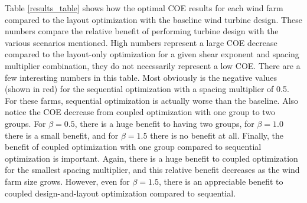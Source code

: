 Table \ref{results_table} shows how the optimal COE results for each wind farm compared to the layout optimization with the baseline wind turbine design. These numbers compare the relative benefit of performing turbine design with the various scenarios mentioned. High numbers represent a large COE decrease compared to the layout-only optimization for a given shear exponent and spacing multiplier combination, they do not necessarily represent a low COE.
There are a few interesting numbers in this table. Most obviously is the negative values (shown in red) for the sequential optimization with a spacing multiplier of 0.5. For these farms, sequential optimization is actually worse than the baseline. Also notice the COE decrease from coupled optimization with one group to two groups. For $\beta=0.5$, there is a huge benefit to having two groups, for $\beta=1.0$ there is a small benefit, and for $\beta=1.5$ there is no benefit at all. Finally, the benefit of coupled optimization with one group compared to sequential optimization is important. Again, there is a huge benefit to coupled optimization for the smallest spacing multiplier, and this relative benefit decreases as the wind farm size grows. However, even for $\beta=1.5$, there is an appreciable benefit to coupled design-and-layout optimization compared to sequential.




